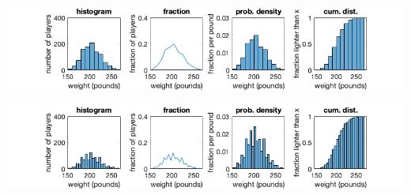 \documentclass[12pt,letterpaper,noanswers]{exam}
\begin{document}
\includegraphics[width=\textwidth]{img/C14histboxweight10.png}

\includegraphics[width=\textwidth]{img/C14histboxweight05.png}




\end{document}

